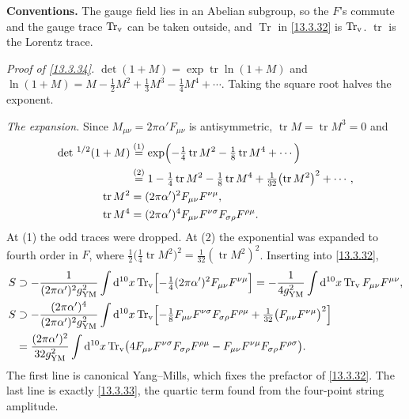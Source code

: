 \begin{tcolorbox}[breakable]
	\begin{remark}
		\textbf{Conventions.} The gauge field lies in an Abelian subgroup, so the $F$'s commute and the gauge trace $\operatorname{Tr}_{\rm v}$ can be taken outside, and $\operatorname{Tr}$ in \eqref{13.3.32} is $\operatorname{Tr}_{\rm v}$. $\operatorname{tr}$ is the Lorentz trace.

		\textit{Proof of \eqref{13.3.34}.} $\det(1+M)=\exp\operatorname{tr}\ln(1+M)$ and $\ln(1+M)=M-\frac12M^2+\frac13M^3-\frac14M^4+\cdots$. Taking the square root halves the exponent.

		\textit{The expansion.} Since $M_{\mu\nu}=2\pi\alpha'F_{\mu\nu}$ is antisymmetric, $\operatorname{tr}M=\operatorname{tr}M^3=0$ and
		\begin{align*}
			\det\,^{1/2}(1 + M) &\overset{(1)}{=} \exp\Bigl(-\tfrac14\operatorname{tr}M^2-\tfrac18\operatorname{tr}M^4+\cdots\Bigr)\\
			&\overset{(2)}{=} 1-\tfrac14\operatorname{tr}M^2-\tfrac18\operatorname{tr}M^4+\tfrac1{32}\bigl(\operatorname{tr}M^2\bigr)^2+\cdots ,\\
			\operatorname{tr}M^2 &= (2\pi\alpha')^2F_{\mu\nu}F^{\nu\mu},\\ \operatorname{tr}M^4&=(2\pi\alpha')^4F_{\mu\nu}F^{\nu\sigma}F_{\sigma\rho}F^{\rho\mu} .
		\end{align*}
		At (1) the odd traces were dropped. At (2) the exponential was expanded to fourth order in $F$, where $\frac12\bigl(\frac14\operatorname{tr}M^2\bigr)^2=\frac1{32}(\operatorname{tr}M^2)^2$. Inserting into \eqref{13.3.32},
		\begin{align*}
			S &\supset -\frac{1}{(2\pi\alpha')^2g_{\rm YM}^2}\int\mathrm{d}^{10}x\operatorname{Tr}_{\rm v}\Bigl[-\tfrac14(2\pi\alpha')^2F_{\mu\nu}F^{\nu\mu}\Bigr]
			= -\frac{1}{4g_{\rm YM}^2}\int\mathrm{d}^{10}x\operatorname{Tr}_{\rm v}F_{\mu\nu}F^{\mu\nu},\\
			S &\supset -\frac{(2\pi\alpha')^4}{(2\pi\alpha')^2g_{\rm YM}^2}\int\mathrm{d}^{10}x\operatorname{Tr}_{\rm v}\Bigl[-\tfrac18F_{\mu\nu}F^{\nu\sigma}F_{\sigma\rho}F^{\rho\mu}+\tfrac1{32}\bigl(F_{\mu\nu}F^{\nu\mu}\bigr)^2\Bigr] \\
			&= \frac{(2\pi\alpha')^2}{32g_{\rm YM}^2}\int\mathrm{d}^{10}x\operatorname{Tr}_{\rm v}\bigl(4F_{\mu\nu}F^{\nu\sigma}F_{\sigma\rho}F^{\rho\mu}-F_{\mu\nu}F^{\nu\mu}F_{\sigma\rho}F^{\rho\sigma}\bigr) .
		\end{align*}
		The first line is canonical Yang--Mills, which fixes the prefactor of \eqref{13.3.32}. The last line is exactly \eqref{13.3.33}, the quartic term found from the four-point string amplitude.
	\end{remark}
\end{tcolorbox}



